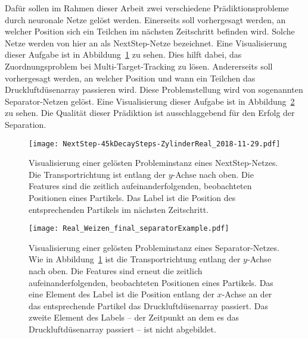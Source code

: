 Dafür sollen im Rahmen dieser Arbeit zwei verschiedene Prädiktionsprobleme durch neuronale Netze gelöst werden.
Einerseits soll vorhergesagt werden, an welcher Position sich ein Teilchen im nächsten Zeitschritt befinden wird.
Solche Netze werden von hier an als NextStep-Netze bezeichnet.
Eine Visualisierung dieser Aufgabe ist in Abbildung~\ref{fig:visualsNextstep} zu sehen.
Dies hilft dabei, das Zuordnungsproblem bei Multi-Target-Tracking zu lösen.
Andererseits soll vorhergesagt werden, an welcher Position und wann ein Teilchen das Druckluftdüsenarray passieren wird.
Diese Problemstellung wird von sogenannten Separator-Netzen gelöst.
Eine Visualisierung dieser Aufgabe ist in Abbildung~\ref{fig:visualsSeparator} zu sehen.
Die Qualität dieser Prädiktion ist ausschlaggebend für den Erfolg der Separation.


\begin{figure}[p]
    \centering
    \texttt{[image: NextStep-45kDecaySteps-ZylinderReal\_2018-11-29.pdf]}
    \caption[Visualisierung einer gelösten Probleminstanz eines NextStep-Netzes]{Visualisierung einer gelösten 
    Probleminstanz eines NextStep-Netzes. Die Transportrichtung ist entlang der \(y\)-Achse nach oben.
    Die Features sind die zeitlich aufeinanderfolgenden, beobachteten Positionen eines Partikels.
    Das Label ist die Position des entsprechenden Partikels im nächsten Zeitschritt.
    }
    \label{fig:visualsNextstep}
\end{figure}


\begin{figure}[p]
    \centering
	\texttt{[image: Real\_Weizen\_final\_separatorExample.pdf]}
    \caption[Visualisierung einer gelösten Probleminstanz eines Separator-Netzes]{Visualisierung einer gelösten Probleminstanz 
    eines Separator-Netzes.
    Wie in Abbildung~\ref{fig:visualsNextstep} ist die Transportrichtung entlang der \(y\)-Achse nach oben.
    Die Features sind erneut die zeitlich aufeinanderfolgenden, beobachteten Positionen eines Partikels.
    Das eine Element des Label ist die Position entlang der \(x\)-Achse an der das entsprechende Partikel das Druckluftdüsenarray passiert.
    Das zweite Element des Labels -- der Zeitpunkt an dem es das Druckluftdüsenarray passiert -- ist nicht abgebildet.
    }
	
	\label{fig:visualsSeparator}
\end{figure}



